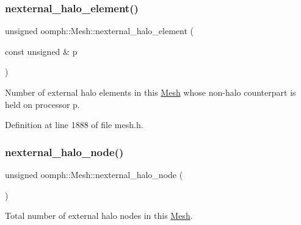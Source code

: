 \mbox{\label{classoomph_1_1Mesh_ab7fd67d0eb09fb55b911f76100adf9fe}} 
\subsubsection{\texorpdfstring{nexternal\+\_\+halo\+\_\+element()}{nexternal\_halo\_element()}\hspace{0.1cm}{\footnotesize\ttfamily [2/2]}}
{\footnotesize\ttfamily unsigned oomph\+::\+Mesh\+::nexternal\+\_\+halo\+\_\+element (\begin{DoxyParamCaption}\item[{const unsigned \&}]{p }\end{DoxyParamCaption})\hspace{0.3cm}{\ttfamily [inline]}}



Number of external halo elements in this \hyperlink{classoomph_1_1Mesh}{Mesh} whose non-\/halo counterpart is held on processor p. 



Definition at line 1888 of file mesh.\+h.

\mbox{\label{classoomph_1_1Mesh_a2dc1f87191771f18f55e9b44664bc7ea}} 
\subsubsection{\texorpdfstring{nexternal\+\_\+halo\+\_\+node()}{nexternal\_halo\_node()}\hspace{0.1cm}{\footnotesize\ttfamily [1/2]}}
{\footnotesize\ttfamily unsigned oomph\+::\+Mesh\+::nexternal\+\_\+halo\+\_\+node (\begin{DoxyParamCaption}{ }\end{DoxyParamCaption})\hspace{0.3cm}{\ttfamily [inline]}}



Total number of external halo nodes in this \hyperlink{classoomph_1_1Mesh}{Mesh}. 



